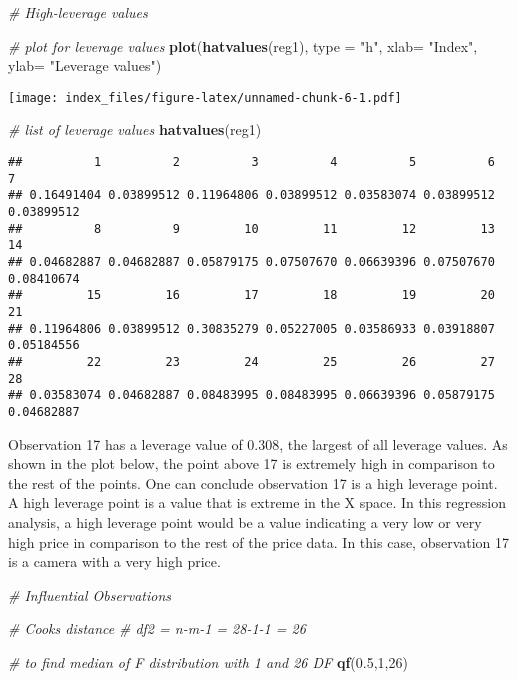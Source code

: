 \documentclass[
]{article}
\newenvironment{Shaded}{\begin{snugshade}}{\end{snugshade}}
\newcommand{\AttributeTok}[1]{\textcolor[rgb]{0.13,0.29,0.53}{#1}}
\newcommand{\CommentTok}[1]{\textcolor[rgb]{0.56,0.35,0.01}{\textit{#1}}}
\newcommand{\DecValTok}[1]{\textcolor[rgb]{0.00,0.00,0.81}{#1}}
\newcommand{\FloatTok}[1]{\textcolor[rgb]{0.00,0.00,0.81}{#1}}
\newcommand{\FunctionTok}[1]{\textcolor[rgb]{0.13,0.29,0.53}{\textbf{#1}}}
\newcommand{\NormalTok}[1]{#1}
\newcommand{\StringTok}[1]{\textcolor[rgb]{0.31,0.60,0.02}{#1}}
\begin{document}
\begin{Shaded}
\begin{Highlighting}[]
\CommentTok{\# High{-}leverage values}

\CommentTok{\# plot for leverage values}
\FunctionTok{plot}\NormalTok{(}\FunctionTok{hatvalues}\NormalTok{(reg1), }\AttributeTok{type =} \StringTok{"h"}\NormalTok{, }\AttributeTok{xlab=} \StringTok{"Index"}\NormalTok{, }\AttributeTok{ylab=} \StringTok{"Leverage values"}\NormalTok{)}
\end{Highlighting}
\end{Shaded}

\texttt{[image: index\_files/figure-latex/unnamed-chunk-6-1.pdf]}

\begin{Shaded}
\begin{Highlighting}[]
\CommentTok{\# list of leverage values}
\FunctionTok{hatvalues}\NormalTok{(reg1)}
\end{Highlighting}
\end{Shaded}

\begin{verbatim}
##          1          2          3          4          5          6          7 
## 0.16491404 0.03899512 0.11964806 0.03899512 0.03583074 0.03899512 0.03899512 
##          8          9         10         11         12         13         14 
## 0.04682887 0.04682887 0.05879175 0.07507670 0.06639396 0.07507670 0.08410674 
##         15         16         17         18         19         20         21 
## 0.11964806 0.03899512 0.30835279 0.05227005 0.03586933 0.03918807 0.05184556 
##         22         23         24         25         26         27         28 
## 0.03583074 0.04682887 0.08483995 0.08483995 0.06639396 0.05879175 0.04682887
\end{verbatim}

Observation 17 has a leverage value of 0.308, the largest of all
leverage values. As shown in the plot below, the point above 17 is
extremely high in comparison to the rest of the points. One can conclude
observation 17 is a high leverage point. A high leverage point is a
value that is extreme in the X space. In this regression analysis, a
high leverage point would be a value indicating a very low or very high
price in comparison to the rest of the price data. In this case,
observation 17 is a camera with a very high price.

\begin{Shaded}
\begin{Highlighting}[]
\CommentTok{\# Influential Observations}

\CommentTok{\# Cooks distance}
\CommentTok{\# df2 = n{-}m{-}1 = 28{-}1{-}1 = 26}

\CommentTok{\# to find median of F distribution with 1 and 26 DF}
\FunctionTok{qf}\NormalTok{(}\FloatTok{0.5}\NormalTok{,}\DecValTok{1}\NormalTok{,}\DecValTok{26}\NormalTok{)}
\end{Highlighting}
\end{Shaded}
\end{document}
